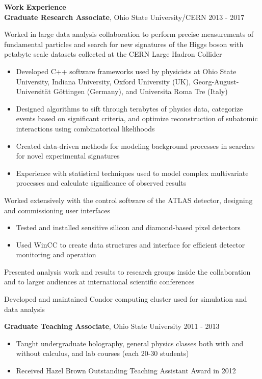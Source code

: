 \documentclass[line]{letter}
\newenvironment{list1}{
  \begin{list}{\ding{113}}{%
      \setlength{\itemsep}{0in}
      \setlength{\parsep}{0in} \setlength{\parskip}{0in}
      \setlength{\topsep}{0in} \setlength{\partopsep}{0in} 
      \setlength{\leftmargin}{0.17in}}}{\end{list}}
\begin{document}
{\vspace{10pt}\Large \bf Work Experience\vspace{7pt}\\}
{\bf Graduate Research Associate}, Ohio State University/CERN \hfill 2013 - 2017 \\
\vspace{-3mm}
\begin{list1}
\item[] Worked in large data analysis collaboration to perform precise measurements of fundamental particles and search for new signatures of the Higgs boson with petabyte scale datasets collected at the CERN Large Hadron Collider
\begin{itemize}
\item Developed C++ software frameworks used by physicists at Ohio State University, Indiana University, Oxford University (UK), Georg-August-Universit{\"a}t G{\"o}ttingen (Germany), and Universita Roma Tre (Italy)
\item Designed algorithms to sift through terabytes of physics data, categorize events based on significant criteria, and optimize reconstruction of subatomic interactions using combinatorical likelihoods 
\item Created data-driven methods for modeling background processes in searches for novel experimental signatures 
\item Experience with statistical techniques used to model complex multivariate processes and calculate significance of observed results
\end{itemize}\vspace{2mm}
\item[] Worked extensively with the control software of the ATLAS detector, designing and commissioning user interfaces
\begin{itemize}
\item Tested and installed sensitive silicon and diamond-based pixel detectors
\item Used WinCC to create data structures and interface for efficient detector monitoring and operation
\end{itemize}\vspace{2mm}
\item[] Presented analysis work and results to research groups inside the collaboration and to larger audiences at international scientific conferences\vspace{2mm}
\item[] Developed and maintained Condor computing cluster used for simulation and data analysis
\end{list1}
\vspace{2mm}
{\bf Graduate Teaching Associate}, Ohio State University \hfill 2011 - 2013 \\
\vspace{-6mm}
\begin{itemize}
\item Taught undergraduate holography, general physics classes both with and without calculus, and lab courses (each 20-30 students)
\item Received Hazel Brown Outstanding Teaching Assistant Award in 2012
\end{itemize}
\end{document}
